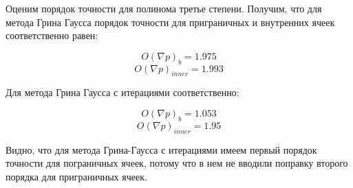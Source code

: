 \begin{table}[H]
    \centering
    \caption{Ошибка вычислений для различных вариантов}
    \label{tab:3}
\end{table}


Оценим порядок точности для полинома третье степени. Получим, что для метода Грина Гаусса порядок точности для приграничных и внутренних ячеек соответственно равен:

$$O(\nabla p)_b = 1.975$$
$$O(\nabla p)_{inner} = 1.993$$

Для метода Грина Гаусса с итерациями соответственно:

$$O(\nabla p)_b = 1.053$$
$$O(\nabla p)_{inner} = 1.95$$

Видно, что для метода Грина-Гаусса с итерациями имеем первый порядок точности для пограничных ячеек, потому что в нем не вводили поправку второго порядка для приграничных ячеек.

